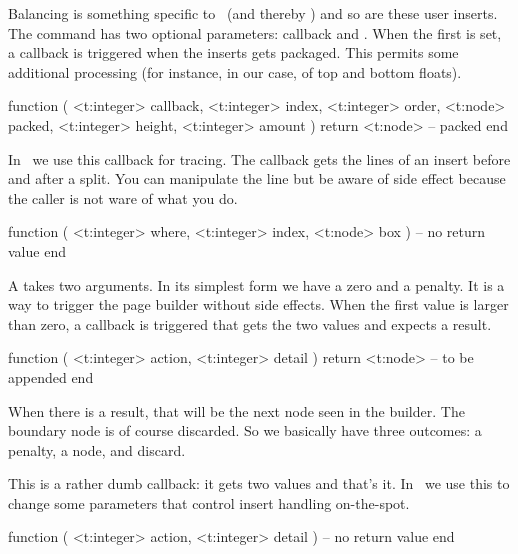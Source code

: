 Balancing is something specific to \LUAMETATEX\ (and thereby \CONTEXT) and so are
these user inserts. The  command has two optional parameters: \typ
{callback} and . When the first is set, a callback is triggered when
the inserts gets packaged. This permits some additional processing (for instance,
in our case, of top and bottom floats).

\starttyping[option=LUA]
function (
    <t:integer> callback,
    <t:integer> index,
    <t:integer> order,
    <t:node>    packed,
    <t:integer> height,
    <t:integer> amount
)
    return <t:node> -- packed
end
\stoptyping

\stopsubsection

\startsubsection[title=insert_check_split]

In \CONTEXT\ we use this callback for tracing. The callback gets the lines of an
insert before and after a split. You can manipulate the line but be aware of side
effect because the caller is not ware of what you do.

\starttyping[option=LUA]
function (
    <t:integer> where,
    <t:integer> index,
    <t:node>    box
)
    -- no return value
end
\stoptyping

\stopsubsection

\startsubsection[title=page_boundary]

A  takes two arguments. In its simplest form we have a zero
and a penalty. It is a way to trigger the page builder without side effects. When the
first value is larger than zero, a callback is triggered that gets the two values
and expects a result.

\starttyping[option=LUA]
function (
    <t:integer> action,
    <t:integer> detail
)
    return <t:node> -- to be appended
end
\stoptyping

When there is a result, that will be the next node seen in the builder. The
boundary node is of course discarded. So we basically have three outcomes: a
penalty, a node, and discard.

\stopsubsection

\startsubsection[title=insert_boundary]

This is a rather dumb callback: it gets two values and that's it. In \CONTEXT\ we
use this to change some parameters that control insert handling on-the-spot.

\starttyping[option=LUA]
function (
    <t:integer> action,
    <t:integer> detail
)
    -- no return value
end
\stoptyping

